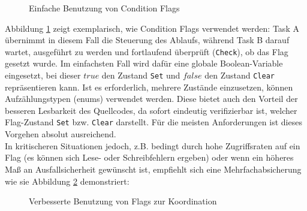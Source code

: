 \documentclass{llncs}
\begin{document}
\begin{figure}[h]
\centering
\def\svgwidth{300pt}

\caption{\label{fig:ConditionFlag} Einfache Benutzung von Condition Flags \autocite[vgl.][83]{Cooling2017}}
\end{figure}

Abbildung \ref{fig:ConditionFlag} zeigt exemplarisch, wie Condition Flags verwendet werden: Task A übernimmt in diesem Fall die Steuerung des Ablaufs, während Task B darauf wartet, ausgeführt zu werden und fortlaufend überprüft (\texttt{Check}), ob das Flag gesetzt wurde. Im einfachsten Fall wird dafür eine globale Boolean-Variable eingesetzt, bei dieser $true$ den Zustand \texttt{Set} und $false$ den Zustand \texttt{Clear} repräsentieren kann. Ist es erforderlich, mehrere Zustände einzusetzen, können Aufzählungstypen (enums) verwendet werden. Diese bietet auch den Vorteil der besseren Lesbarkeit des Quellcodes, da sofort eindeutig verifizierbar ist, welcher Flag-Zustand \texttt{Set} bzw. \texttt{Clear} darstellt. Für die meisten Anforderungen ist dieses Vorgehen absolut ausreichend. \autocite[vgl.][84]{Cooling2017}\\

In kritischeren Situationen jedoch, z.B. bedingt durch hohe Zugriffsraten auf ein Flag (es können sich Lese- oder Schreibfehlern ergeben) oder wenn ein höheres Maß an Ausfallsicherheit gewünscht ist, empfiehlt sich eine Mehrfachabsicherung wie sie Abbildung \ref{fig:ConditionFlag2} demonstriert:

\begin{figure} [h]
	\centering
	\def\svgwidth{300pt}
	
	\caption{\label{fig:ConditionFlag2} Verbesserte Benutzung von Flags zur Koordination \autocite[vgl.][84]{Cooling2017}}
\end{figure}
\end{document}
